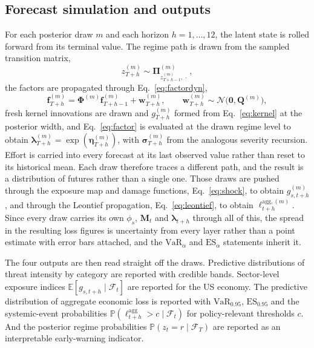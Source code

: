 \documentclass[review]{elsarticle}
\newcommand{\E}{\mathbb{E}}
\newcommand{\Prob}{\mathbb{P}}
\begin{document}
\subsection{Forecast simulation and outputs}

For each posterior draw $m$ and each horizon $h = 1, \dots, 12$, the latent state is rolled forward from its terminal value. The regime path is drawn from the sampled transition matrix,
\[
    z^{(m)}_{T+h} \sim \bm{\Pi}^{(m)}_{z^{(m)}_{T+h-1}, \,\cdot\,},
\]
the factors are propagated through Eq.~\ref{eq:factordyn},
\[
    \bm{f}^{(m)}_{T+h} = \bm{\Phi}^{(m)} \bm{f}^{(m)}_{T+h-1} + \bm{w}^{(m)}_{T+h},
    \qquad \bm{w}^{(m)}_{T+h} \sim \mathcal{N}\big(\bm{0}, \bm{Q}^{(m)}\big),
\]
fresh kernel innovations are drawn and $g^{(m)}_{T+h}$ formed from Eq.~\ref{eq:kernel} at the posterior width, and Eq.~\ref{eq:factor} is evaluated at the drawn regime level to obtain $\bm{\lambda}^{(m)}_{T+h} = \exp(\bm{\eta}^{(m)}_{T+h})$, with $\bm{\sigma}^{(m)}_{T+h}$ from the analogous severity recursion. Effort is carried into every forecast at its last observed value rather than reset to its historical mean. Each draw therefore traces a different path, and the result is a distribution of futures rather than a single one. Those draws are pushed through the exposure map and damage functions, Eq.~\ref{eq:shock}, to obtain $g^{(m)}_{s,t+h}$, and through the Leontief propagation, Eq.~\ref{eq:leontief}, to obtain $\ell^{\mathrm{agg},(m)}_{t+h}$. Since every draw carries its own $\phi_s$, $\bm{M}_t$ and $\bm{\lambda}_{t+h}$ through all of this, the spread in the resulting loss figures is uncertainty from every layer rather than a point estimate with error bars attached, and the $\mathrm{VaR}_\alpha$ and $\mathrm{ES}_\alpha$ statements inherit it.

The four outputs are then read straight off the draws. Predictive distributions of threat intensity by category are reported with credible bands. Sector-level exposure indices $\E[g_{s,t+h} \mid \mathcal{F}_t]$ are reported for the US economy. The predictive distribution of aggregate economic loss is reported with $\mathrm{VaR}_{0.95}$, $\mathrm{ES}_{0.95}$ and the systemic-event probabilities $\Prob(\ell^{\mathrm{agg}}_{t+h} > c \mid \mathcal{F}_t)$ for policy-relevant thresholds $c$. And the posterior regime probabilities $\Prob(z_t = r \mid \mathcal{F}_T)$ are reported as an interpretable early-warning indicator.
\end{document}
